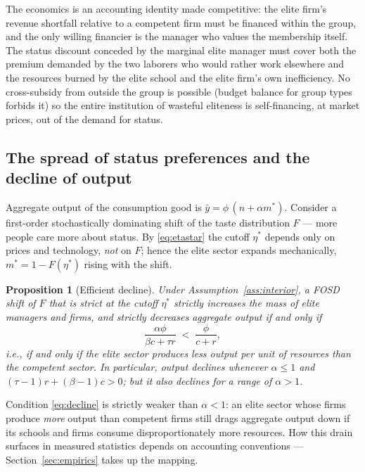 \documentclass[12pt,letterpaper]{article}
\newtheorem{proposition}{Proposition}
\theoremstyle{definition}
\begin{document}
The economics is an accounting identity made competitive: the elite firm's revenue shortfall relative to a competent firm must be financed within the group, and the only willing financier is the manager who values the membership itself.
The status discount conceded by the marginal elite manager must cover both the premium demanded by the two laborers who would rather work elsewhere and the resources burned by the elite school and the elite firm's own inefficiency.
No cross-subsidy from outside the group is possible (budget balance for group types forbids it) so the entire institution of wasteful eliteness is self-financing, at market prices, out of the demand for status.

\subsection{The spread of status preferences and the decline of output}

Aggregate output of the consumption good is $\bar{y}=\phi\,(n+\alpha m^\ast)$.
Consider a first-order stochastically dominating shift of the taste distribution $F$ --- more people care more about status.
By \eqref{eq:etastar} the cutoff $\eta^\ast$ depends only on prices and technology, \emph{not} on $F$; hence the elite sector expands mechanically, $m^\ast = 1-F(\eta^\ast)$ rising with the shift.

\begin{proposition}[Efficient decline]\label{prop:decline} Under Assumption~\ref{ass:interior}, a FOSD shift of $F$ that is strict at the cutoff $\eta^\ast$ strictly increases the mass of elite managers and firms, and strictly decreases aggregate output if and only if
\begin{equation}\label{eq:decline}
  \frac{\alpha\phi}{\beta c + \tau r} \;<\; \frac{\phi}{c+r},
\end{equation}
i.e., if and only if the elite sector produces less output per unit of resources than the competent sector.
In particular, output declines whenever $\alpha\leq 1$ and $(\tau-1)r+(\beta-1)c>0$; but it also declines for a range of $\alpha>1$.
\end{proposition}

Condition \eqref{eq:decline} is strictly weaker than $\alpha<1$: an elite sector whose firms produce \emph{more} output than competent firms still drags aggregate output down if its schools and firms consume disproportionately more resources.
How this drain surfaces in measured statistics depends on accounting conventions --- Section~\ref{sec:empirics} takes up the mapping.
\end{document}
